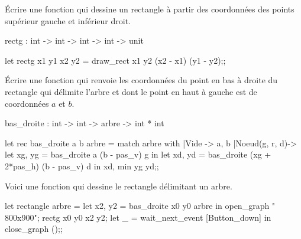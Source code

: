 \begin{question}{}{}
Écrire une fonction  qui dessine un rectangle à partir des coordonnées des points supérieur gauche et inférieur droit.
\begin{ocaml}
rectg : int -> int -> int -> int -> unit
\end{ocaml}
\reponse

\begin{ocaml}
let rectg x1 y1 x2 y2 =
draw_rect x1 y2 (x2 - x1) (y1 - y2);;
\end{ocaml}
\end{question}
\begin{question}{}{}
Écrire une fonction  qui renvoie les coordonnées du point en bas à  droite du rectangle qui délimite l'arbre et dont le point en haut à gauche est de coordonnées $a$ et $b$.
\begin{ocaml}
bas_droite : int -> int -> arbre -> int * int
\end{ocaml}

\reponse

\begin{ocaml}
let rec bas_droite a b arbre =
  match arbre with
  |Vide -> a, b
  |Noeud(g, r, d)-> 
            let xg, yg = bas_droite a (b - pas_v) g in
            let xd, yd = bas_droite (xg + 2*pas_h) 
                                    (b - pas_v) d in
  xd, min yg yd;;
\end{ocaml}
\end{question}

Voici une fonction qui dessine le rectangle délimitant un arbre.
\begin{ocaml}
let rectangle arbre =
  let x2, y2 = bas_droite x0 y0 arbre in
  open_graph " 800x900";
  rectg x0 y0 x2 y2;
  let _ = wait_next_event [Button_down] in close_graph ();;
\end{ocaml}

